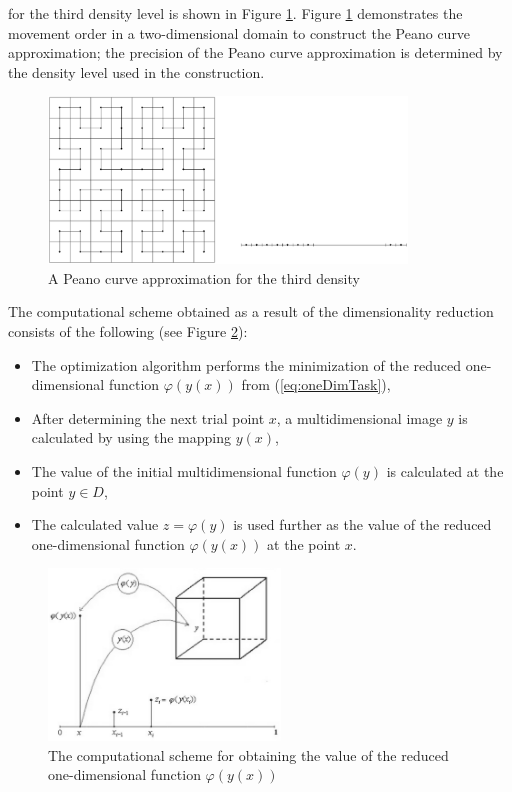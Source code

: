 \documentclass{aims}
\theoremstyle{definition}
\begin{document}
for the third density level is shown in Figure \ref{fig:peanoC}. Figure \ref{fig:peanoC}
demonstrates the movement order in a two-dimensional domain to construct the Peano
curve approximation; the precision of the Peano curve approximation is determined by the
density level used in the construction.
\begin{figure}
    \centering
    \includegraphics[width=0.85\textwidth]{pictures/peanoC.eps}
    \caption{A Peano curve approximation for the third density}
    \label{fig:peanoC}
\end{figure}

\par
The computational scheme obtained as a result of the dimensionality reduction consists of the following
(see Figure \ref{fig:peanoCUsage}):
\begin{itemize}
  \item The optimization algorithm performs the minimization of the reduced one-dimensional
  function \(\varphi(y(x))\) from (\ref{eq:oneDimTask}),
  \item After determining the next trial point \(x\), a multidimensional image \(y\) is calculated by using the
mapping \(y(x)\),
  \item The value of the initial multidimensional function \(\varphi(y)\) is calculated at the point \(y\in D\),
  \item The calculated value \(z=\varphi(y)\) is used further as the value of the reduced one-dimensional function \(\varphi(y(x))\) at the point \(x\).
\end{itemize}

\begin{figure}
    \centering
    \includegraphics[width=0.55\textwidth]{pictures/peanoCUsage.eps}
    \caption{The computational scheme for obtaining the value of the reduced one-dimensional function \(\varphi(y(x))\)}
    \label{fig:peanoCUsage}
\end{figure}
\end{document}
